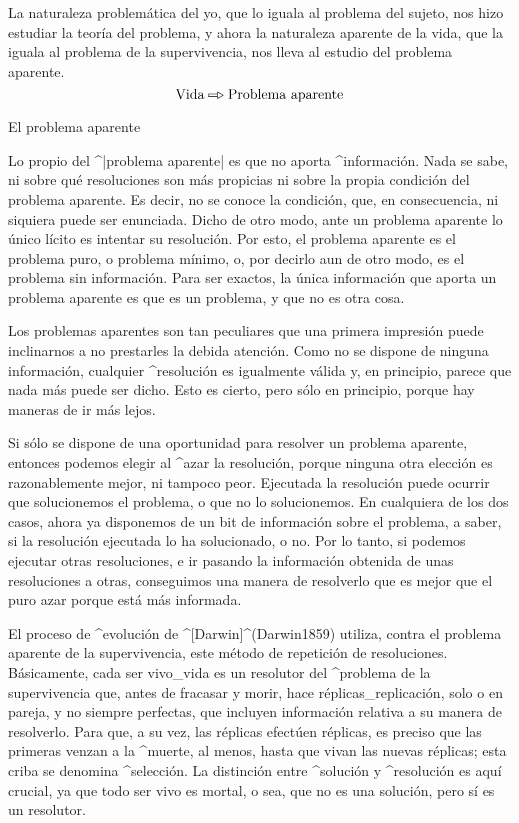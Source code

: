 La naturaleza problemática del yo, que lo iguala al problema del sujeto,
nos hizo estudiar la teoría del problema, y ahora la naturaleza aparente
de la vida, que la iguala al problema de la supervivencia, nos lleva al
estudio del problema aparente.
$$\hbox{Vida} \etapa \hbox{Problema aparente}$$


\Section El problema aparente

Lo propio del ^|problema aparente| es que no aporta ^{información}. Nada
se sabe, ni sobre qué resoluciones son más propicias ni sobre la propia
condición del problema aparente. Es decir, no se conoce la condición,
que, en consecuencia, ni siquiera puede ser enunciada. Dicho de otro
modo, ante un problema aparente lo único lícito es intentar su
resolución. Por esto, el problema aparente es el problema puro, o
problema mínimo, o, por decirlo aun de otro modo, es el problema sin
información. Para ser exactos, la única información que aporta un
problema aparente es que es un problema, y que no es otra cosa.

Los problemas aparentes son tan peculiares que una primera impresión
puede inclinarnos a no prestarles la debida atención. Como no se dispone
de ninguna información, cualquier ^{resolución} es igualmente válida y,
en principio, parece que nada más puede ser dicho. Esto es cierto, pero
sólo en principio, porque hay maneras de ir más lejos.

Si sólo se dispone de una oportunidad para resolver un problema
aparente, entonces podemos elegir al ^{azar} la resolución, porque
ninguna otra elección es razonablemente mejor, ni tampoco peor.
Ejecutada la resolución puede ocurrir que solucionemos el problema, o
que no lo solucionemos. En cualquiera de los dos casos, ahora ya
disponemos de un bit de información sobre el problema, a saber, si la
resolución ejecutada lo ha solucionado, o no. Por lo tanto, si podemos
ejecutar otras resoluciones, e ir pasando la información obtenida de
unas resoluciones a otras, conseguimos una manera de resolverlo que es
mejor que el puro azar porque está más informada.

El proceso de ^{evolución} de ^[Darwin]^(Darwin1859) utiliza, contra el
problema aparente de la supervivencia, este método de repetición de
resoluciones. Básicamente, cada ser vivo_{vida} es un resolutor del
^{problema de la supervivencia} que, antes de fracasar y morir, hace
réplicas_{replicación}, solo o en pareja, y no siempre perfectas, que
incluyen información relativa a su manera de resolverlo. Para que, a su
vez, las réplicas efectúen réplicas, es preciso que las primeras venzan
a la ^{muerte}, al menos, hasta que vivan las nuevas réplicas; esta
criba se denomina ^{selección}. La distinción entre ^{solución} y
^{resolución} es aquí crucial, ya que todo ser vivo es mortal, o sea,
que no es una solución, pero sí es un resolutor.


